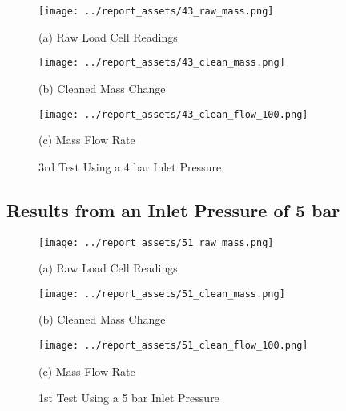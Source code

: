 \begin{figure}[htbp]
    \centering

    \begin{minipage}{0.32\textwidth}
        \centering
        \texttt{[image: ../report\_assets/43\_raw\_mass.png]}
        \caption*{(a) Raw Load Cell Readings}
    \end{minipage}
    \hfill
    \begin{minipage}{0.32\textwidth}
        \centering
        \texttt{[image: ../report\_assets/43\_clean\_mass.png]}
        \caption*{(b) Cleaned Mass Change}
    \end{minipage}
    \hfill
    \begin{minipage}{0.32\textwidth}
        \centering
        \texttt{[image: ../report\_assets/43\_clean\_flow\_100.png]}
        \caption*{(c) Mass Flow Rate}
    \end{minipage}
    \caption{3rd Test Using a 4 bar Inlet Pressure}
    
\end{figure}\label{fig:43}
\vfill

\newpage

\subsection{Results from an Inlet Pressure of 5 bar}
\vfill
\begin{figure}[htbp]
    \centering

    \begin{minipage}{0.32\textwidth}
        \centering
        \texttt{[image: ../report\_assets/51\_raw\_mass.png]}
        \caption*{(a) Raw Load Cell Readings}
    \end{minipage}
    \hfill
    \begin{minipage}{0.32\textwidth}
        \centering
        \texttt{[image: ../report\_assets/51\_clean\_mass.png]}
        \caption*{(b) Cleaned Mass Change}
    \end{minipage}
    \hfill
    \begin{minipage}{0.32\textwidth}
        \centering
        \texttt{[image: ../report\_assets/51\_clean\_flow\_100.png]}
        \caption*{(c) Mass Flow Rate}
    \end{minipage}
    \caption{1st Test Using a 5 bar Inlet Pressure}
    
\end{figure}\label{fig:51}
\vfill

